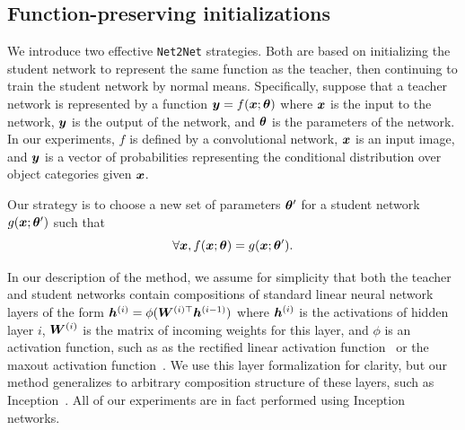\documentclass{article} %
\begin{document}
\subsection{Function-preserving initializations}

We introduce two effective {\tt Net2Net} strategies. Both are based on
initializing the student network to represent the same function as the
teacher, then continuing to train the student network by normal means.
Specifically, suppose that a teacher network is represented by a function
$ {\bm{y}} = f({\bm{x}} ; {\bm{\theta}}) $
where ${\bm{x}}$ is the input to the network, ${\bm{y}}$ is the output of the network,
and ${\bm{\theta}}$ is the parameters of the network.
In our experiments, $f$ is defined by a convolutional network,
${\bm{x}}$ is an input image, and ${\bm{y}}$ is a vector of probabilities representing
the conditional distribution over object categories given ${\bm{x}}$.

Our strategy is to choose a new set of parameters ${\bm{\theta}}'$ for a student
network $g({\bm{x}} ; {\bm{\theta}}')$ such that
\[ \forall {\bm{x}}, f({\bm{x}}; {\bm{\theta}}) = g({\bm{x}}; {\bm{\theta}}') .\]

In our description of the method, we assume for simplicity that both the teacher
and student networks contain compositions of
standard linear neural network layers of the form
${\bm{h}}^{(i)} = \phi( {\bm{W}}^{(i)\top} {\bm{h}}^{(i-1)} )$
where ${\bm{h}}^{(i)}$ is the activations of hidden layer $i$, ${\bm{W}}^{(i)}$ is the
matrix of incoming weights for this layer, and $\phi$ is an activation function,
such as as the rectified linear activation function~\citep{Jarrett-ICCV2009,Glorot+al-AI-2011-small}
or the maxout activation function~\citep{Goodfellow_maxout_2013}.
We use this layer formalization for clarity, but our method generalizes to arbitrary
composition structure of these layers, such as Inception~\citep{Szegedy-et-al-arxiv2014}.
All of our experiments are in fact performed using Inception networks.
\end{document}
